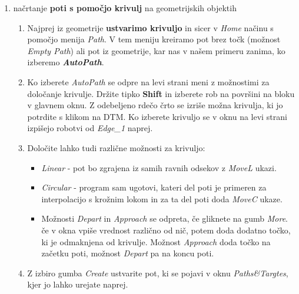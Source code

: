 \begin{enumerate}
\item \vspace*{0.2cm} načrtanje \textbf{poti s pomočjo krivulj} na
geometrijskih objektih
\begin{enumerate}
    \item Najprej iz geometrije \textbf{ustvarimo krivuljo} in sicer v \emph{Home} načinu s pomočjo menija \emph{Path}. V tem meniju kreiramo pot brez točk (možnost \emph{Empty Path}) ali pot iz geometrije, kar nas v našem primeru zanima, ko izberemo \textbf{\emph{AutoPath}}.
        \item Ko izberete \emph{AutoPath} se odpre na levi strani meni z možnostimi za določanje krivulje. Držite tipko \textbf{Shift} in izberete rob na površini na bloku v glavnem oknu. Z odebeljeno rdečo črto se izriše možna krivulja, ki jo potrdite s klikom na DTM. Ko izberete krivuljo se v oknu na levi strani izpišejo robotvi od \emph{Edge\_1} naprej.
        \item Določite lahko tudi različne možnosti za krivuljo:
        \begin{itemize}
        \item \emph{Linear} - pot bo zgrajena iz samih ravnih odsekov z \emph{MoveL} ukazi.
        \item \emph{Circular} - program sam ugotovi, kateri del poti je primeren za interpolacijo s krožnim lokom in za ta del poti doda \emph{MoveC} ukaze.
        \item Možnosti \emph{Depart} in \emph{Approach} se odpreta, če gliknete na gumb \emph{More}. če v okna vpiše vrednost različno od nič, potem doda dodatno točko, ki je odmaknjena od krivulje. Možnost \emph{Approach} doda točko na začetku poti, možnost \emph{Depart} pa na koncu poti.
        \end{itemize}
        \item Z izbiro gumba \emph{Create} ustvarite pot, ki se pojavi v oknu \emph{Paths\&Targtes}, kjer jo lahko urejate naprej.



\end{enumerate}
\end{enumerate}
